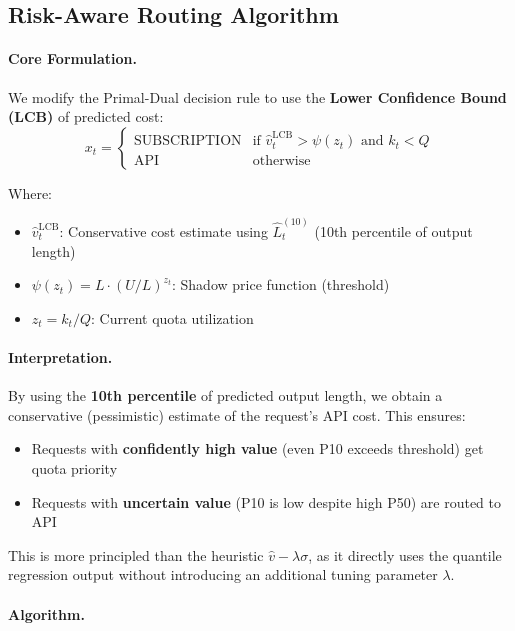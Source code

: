 \documentclass[11pt]{article}
\begin{document}
\subsection{Risk-Aware Routing Algorithm}

\paragraph{Core Formulation.}
We modify the Primal-Dual decision rule to use the \textbf{Lower Confidence Bound (LCB)} of predicted cost:
\[
x_t =
\begin{cases}
\text{SUBSCRIPTION} & \text{if } \hat{v}^{\text{LCB}}_t > \psi(z_t) \text{ and } k_t < Q \\[5pt]
\text{API} & \text{otherwise}
\end{cases}
\]

Where:
\begin{itemize}
  \item $\hat{v}^{\text{LCB}}_t$: Conservative cost estimate using $\hat{L}^{(10)}_t$ (10th percentile of output length)
  \item $\psi(z_t) = L \cdot (U/L)^{z_t}$: Shadow price function (threshold)
  \item $z_t = k_t / Q$: Current quota utilization
\end{itemize}

\paragraph{Interpretation.}
By using the \textbf{10th percentile} of predicted output length, we obtain a conservative (pessimistic) estimate of the request's API cost. This ensures:
\begin{itemize}
  \item Requests with \textbf{confidently high value} (even P10 exceeds threshold) get quota priority
  \item Requests with \textbf{uncertain value} (P10 is low despite high P50) are routed to API
\end{itemize}

This is more principled than the heuristic $\hat{v} - \lambda \sigma$, as it directly uses the quantile regression output without introducing an additional tuning parameter $\lambda$.

\paragraph{Algorithm.}
\end{document}
